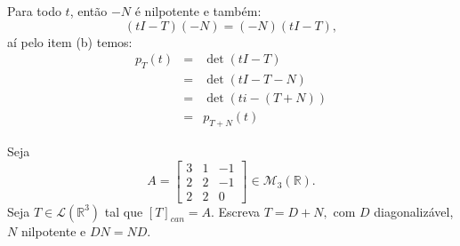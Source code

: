 \documentclass[11pt,a4paper]{article}
\begin{document}
{\dividiritens{
\task[\pers{c}]
}
Para todo $t$, então $-N$ é nilpotente e também:
\[
(tI-T)(-N)=(-N)(tI-T),
\]
aí pelo item (b) temos:
\[
\begin{array}{rcl}
p_T(t) &=& \det(tI-T) \\
 &=& \det(tI-T-N) \\
&=& \det(ti-(T+N)) \\
&=& p_{T+N}(t)
\end{array}
\]
}

 Seja
\[
A = \begin{bmatrix}
3 & 1 & -1 \\
2 & 2 & -1 \\
2 & 2 & 0
\end{bmatrix} \in \mathcal{M}_3(\mathbb{R}).
\]
Seja $T \in \mathcal{L}(\mathbb{R}^3)$ tal que $[T]_{can} = A.$ Escreva $T = D + N,$ com $D$ diagonalizável, $N$ nilpotente e $DN = ND.$
\end{document}
